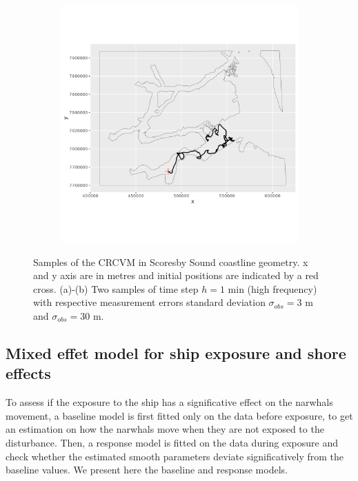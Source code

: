 \documentclass[11pt]{article}
\newcommand {\1}{\mathbb{1}}
\begin{document}
\begin{figure}[H]
\begin{subfigure}{0.48\textwidth}
 		\includegraphics[scale=0.5]{images/simulation study/samples_fjords_hf_e_omega.png}
 		\caption{}
 	\end{subfigure}
 	\caption{Samples of the CRCVM in Scoresby Sound coastline geometry. x and y axis are in metres and initial positions are indicated by a red cross. (a)-(b) Two samples of time step $h=1$ min (high frequency) with respective measurement errors standard deviation $\sigma_{obs}=3$ m and $\sigma_{obs}=30$ m.}
 	\label{fig: samples_fjords_CRCVM}
 \end{figure}
 
 

\subsection{Mixed effet model for ship exposure and shore effects}
\label{subsection: ship exposure effect}


To assess if the exposure to the ship has a significative effect on the narwhals movement, a baseline model is first fitted only on the data before exposure, to get an estimation on how the narwhals move when they are not exposed to the disturbance. Then, a response model is fitted on the data during exposure and check whether the estimated smooth parameters deviate significatively from the baseline values. We present here the baseline and response models.\\
\end{document}
